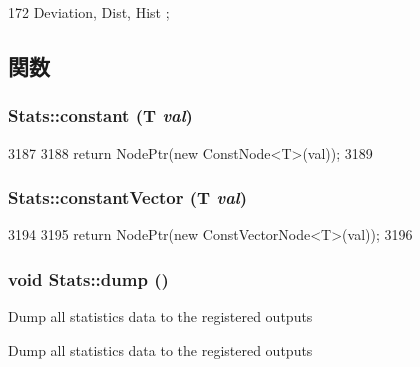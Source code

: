 \begin{DoxyCode}
172 { Deviation, Dist, Hist };
\end{DoxyCode}


\subsection{関数}
\hypertarget{namespaceStats_aee7bc2d5f58c9e1c5d24007800542032}{
\subsubsection[{constant}]{ Stats::constant (T {\em val})}}
\label{namespaceStats_aee7bc2d5f58c9e1c5d24007800542032}



\begin{DoxyCode}
3187 {
3188     return NodePtr(new ConstNode<T>(val));
3189 }
\end{DoxyCode}
\hypertarget{namespaceStats_a60d2ae8cfe1fa437cac8afbeab4999da}{
\subsubsection[{constantVector}]{ Stats::constantVector (T {\em val})}}
\label{namespaceStats_a60d2ae8cfe1fa437cac8afbeab4999da}



\begin{DoxyCode}
3194 {
3195     return NodePtr(new ConstVectorNode<T>(val));
3196 }
\end{DoxyCode}
\hypertarget{namespaceStats_a0f20c2022d6828b0b8f40e78824bc4a3}{
\subsubsection[{dump}]{\setlength{\rightskip}{0pt plus 5cm}void Stats::dump ()}}
\label{namespaceStats_a0f20c2022d6828b0b8f40e78824bc4a3}
Dump all statistics data to the registered outputs

\begin{DoxyVerb}Dump all statistics data to the registered outputs\end{DoxyVerb}
 


